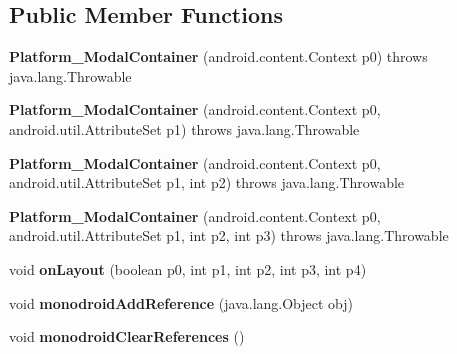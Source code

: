 \subsection*{Public Member Functions}
\begin{DoxyCompactItemize}
\item 
\mbox{\label{classmd5270abb39e60627f0f200893b490a1ade_1_1_platform___modal_container_a92a10110c5163250038b70eac72edf9c}} 
{\bfseries Platform\+\_\+\+Modal\+Container} (android.\+content.\+Context p0)  throws java.\+lang.\+Throwable 	
\item 
\mbox{\label{classmd5270abb39e60627f0f200893b490a1ade_1_1_platform___modal_container_a7902058e4fdbac267c6743c1b4d61fa1}} 
{\bfseries Platform\+\_\+\+Modal\+Container} (android.\+content.\+Context p0, android.\+util.\+Attribute\+Set p1)  throws java.\+lang.\+Throwable 	
\item 
\mbox{\label{classmd5270abb39e60627f0f200893b490a1ade_1_1_platform___modal_container_a65fa53ddac943e43d486ad88b1f799f5}} 
{\bfseries Platform\+\_\+\+Modal\+Container} (android.\+content.\+Context p0, android.\+util.\+Attribute\+Set p1, int p2)  throws java.\+lang.\+Throwable 	
\item 
\mbox{\label{classmd5270abb39e60627f0f200893b490a1ade_1_1_platform___modal_container_aa1bbc21be7a4fa6c380204d67db4c391}} 
{\bfseries Platform\+\_\+\+Modal\+Container} (android.\+content.\+Context p0, android.\+util.\+Attribute\+Set p1, int p2, int p3)  throws java.\+lang.\+Throwable 	
\item 
\mbox{\label{classmd5270abb39e60627f0f200893b490a1ade_1_1_platform___modal_container_a20efd00b191e1b55e8d67cfe214aa46e}} 
void {\bfseries on\+Layout} (boolean p0, int p1, int p2, int p3, int p4)
\item 
\mbox{\label{classmd5270abb39e60627f0f200893b490a1ade_1_1_platform___modal_container_ad613a79affc6cde31a12e95b9b2f051a}} 
void {\bfseries monodroid\+Add\+Reference} (java.\+lang.\+Object obj)
\item 
\mbox{\label{classmd5270abb39e60627f0f200893b490a1ade_1_1_platform___modal_container_a552d05eeda2de9e27a1186fb70663ddd}} 
void {\bfseries monodroid\+Clear\+References} ()
\end{DoxyCompactItemize}
